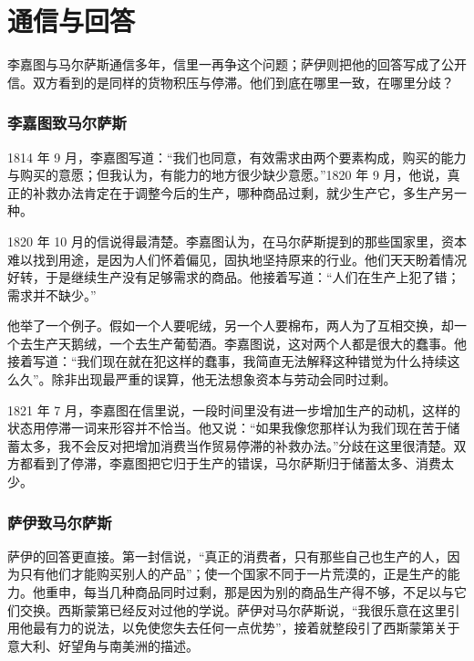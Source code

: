 \section{通信与回答}\label{sec:say-debate}

李嘉图与马尔萨斯通信多年，信里一再争这个问题；萨伊则把他的回答写成了公开信。双方看到的是同样的货物积压与停滞。他们到底在哪里一致，在哪里分歧？

\subsubsection{李嘉图致马尔萨斯}
1814 年 9 月，李嘉图写道：“我们也同意，有效需求由两个要素构成，购买的能力与购买的意愿；但我认为，有能力的地方很少缺少意愿。”\cite{ricardo_letters}1820 年 9 月，他说，真正的补救办法肯定在于调整今后的生产，哪种商品过剩，就少生产它，多生产另一种\cite{ricardo_letters}。

1820 年 10 月的信说得最清楚。李嘉图认为，在马尔萨斯提到的那些国家里，资本难以找到用途，是因为人们怀着偏见，固执地坚持原来的行业。他们天天盼着情况好转，于是继续生产没有足够需求的商品。他接着写道：“人们在生产上犯了错；需求并不缺少。”\cite{ricardo_letters}

他举了一个例子。假如一个人要呢绒，另一个人要棉布，两人为了互相交换，却一个去生产天鹅绒，一个去生产葡萄酒。李嘉图说，这对两个人都是很大的蠢事。他接着写道：“我们现在就在犯这样的蠢事，我简直无法解释这种错觉为什么持续这么久”\cite{ricardo_letters}。除非出现最严重的误算，他无法想象资本与劳动会同时过剩\cite{ricardo_letters}。

1821 年 7 月，李嘉图在信里说，一段时间里没有进一步增加生产的动机，这样的状态用停滞一词来形容并不恰当。他又说：“如果我像您那样认为我们现在苦于储蓄太多，我不会反对把增加消费当作贸易停滞的补救办法。”\cite{ricardo_letters}分歧在这里很清楚。双方都看到了停滞，李嘉图把它归于生产的错误，马尔萨斯归于储蓄太多、消费太少。

\subsubsection{萨伊致马尔萨斯}
萨伊的回答更直接。第一封信说，“真正的消费者，只有那些自己也生产的人，因为只有他们才能购买别人的产品”；使一个国家不同于一片荒漠的，正是生产的能力\cite{saylet1821}。他重申，每当几种商品同时过剩，那是因为别的商品生产得不够，不足以与它们交换\cite{saylet1821}。西斯蒙第已经反对过他的学说。萨伊对马尔萨斯说，“我很乐意在这里引用他最有力的说法，以免使您失去任何一点优势”，接着就整段引了西斯蒙第关于意大利、好望角与南美洲的描述\cite{saylet1821}。

